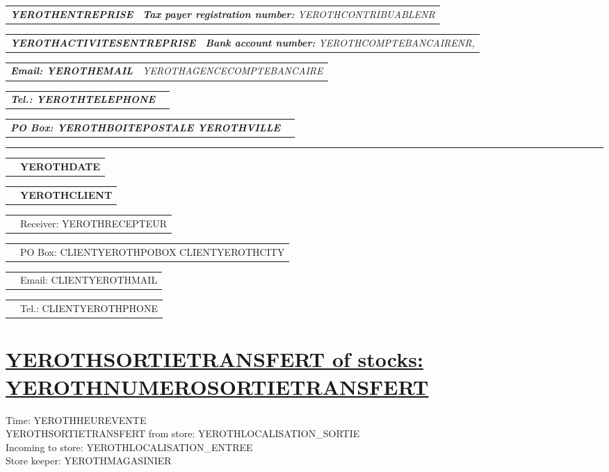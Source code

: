 \documentclass[11pt,YEROTHPAPERSPEC]{article} %
\makeatletter
\newcommand{\headerrow}[2]
{\begin{tabular*}{\linewidth}{l@{\extracolsep{\fill}}r}
	#1 &
	#2 \\
\end{tabular*}}
\newcommand{\emphbold}[1]{\textbf{\emph{#1}}\xspace}
\makeatother
\begin{document}
\bigskip

\headerrow
	{\emphbold{YEROTHENTREPRISE}}
	{\emph{\textbf{Tax payer registration number:} YEROTHCONTRIBUABLENR}}
\headerrow
	{\emphbold{YEROTHACTIVITESENTREPRISE}}
	{\emph{\textbf{Bank account number:} YEROTHCOMPTEBANCAIRENR,}}
\headerrow
	{\emphbold{Email: YEROTHEMAIL}}
	{\emph{YEROTHAGENCECOMPTEBANCAIRE}}
\headerrow
	{\emphbold{Tel.: YEROTHTELEPHONE}}
	{}
\headerrow
	{\emphbold{PO Box: YEROTHBOITEPOSTALE YEROTHVILLE}}
	{}
	
\hrule

\headerrow
	{}
	{\textbf{YEROTHDATE}} 

\vspace*{0.9cm}

\headerrow
{}
{\textbf{YEROTHCLIENT}}
\headerrow
{}
{Receiver: YEROTHRECEPTEUR}
\headerrow
{}
{PO Box: CLIENTYEROTHPOBOX CLIENTYEROTHCITY}
\headerrow
{}
{Email: CLIENTYEROTHMAIL}
\headerrow
{}
{Tel.: CLIENTYEROTHPHONE}

\section*{\underline{YEROTHSORTIETRANSFERT of stocks: YEROTHNUMEROSORTIETRANSFERT}}
Time: YEROTHHEUREVENTE\\
YEROTHSORTIETRANSFERT from store: YEROTHLOCALISATION_SORTIE\\
Incoming to store: YEROTHLOCALISATION_ENTREE\\
Store keeper: YEROTHMAGASINIER

\vspace*{0.3cm}
\end{document}
